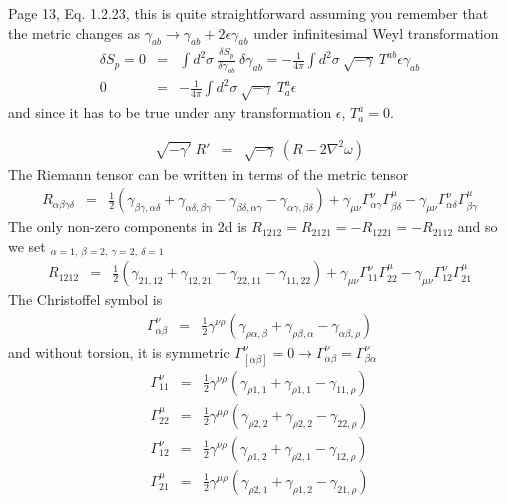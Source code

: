 \documentclass[aps,preprint,preprintnumbers,nofootinbib,showpacs,prd]{revtex4-1}
\newcommand{\nbea}{\begin{eqnarray*}}
\newcommand{\neea}{\end{eqnarray*}}
\begin{document}
Page 13, Eq. 1.2.23, this is quite straightforward assuming you remember that the metric changes as $\gamma_{ab} \rightarrow \gamma_{ab} + 2\epsilon\gamma_{ab}$ under infinitesimal Weyl transformation
%
\nbea
\delta S_p = 0 & = & \int d^2\sigma~\frac{\delta S_p}{\delta \gamma_{ab}} ~\delta \gamma_{ab} = -\frac{1}{4\pi} \int d^2\sigma~\sqrt{-\gamma} ~T^{ab} \epsilon \gamma_{ab} \\
0 & = & -\frac{1}{4\pi} \int d^2\sigma~\sqrt{-\gamma} ~T^{a}_a \epsilon
\neea
%
and since it has to be true under any transformation $\epsilon$, $T^a_a = 0$.





%
\nbea
\sqrt{-\gamma'}~R' & = & \sqrt{-\gamma}~(R - 2\nabla^2\omega)
\neea
%
The Riemann tensor can be written in terms of the metric tensor
%
\nbea
R_{\alpha\beta\gamma\delta} & = & \frac{1}{2} \left ( \gamma_{\beta\gamma,\alpha\delta} + \gamma_{\alpha\delta,\beta\gamma} - \gamma_{\beta\delta,\alpha\gamma} - \gamma_{\alpha\gamma,\beta\delta} \right ) + \gamma_{\mu\nu}\Gamma^{\nu}_{\alpha\gamma}\Gamma^{\mu}_{\beta\delta} - \gamma_{\mu\nu}\Gamma^{\nu}_{\alpha\delta}\Gamma^{\mu}_{\beta\gamma}
\neea
%
The only non-zero components in 2d is $R_{1212}=R_{2121}=-R_{1221}=-R_{2112}$ and so we set $_{\alpha = 1,~ \beta = 2, ~\gamma=2, ~\delta = 1}$
%
\nbea
R_{1212} & = & \frac{1}{2} \left ( \gamma_{21,12} + \gamma_{12,21} - \gamma_{22,11} - \gamma_{11,22} \right ) + \gamma_{\mu\nu}\Gamma^{\nu}_{11}\Gamma^{\mu}_{22} - \gamma_{\mu\nu}\Gamma^{\nu}_{12}\Gamma^{\mu}_{21}
\neea
%
The Christoffel symbol is
%
\nbea
\Gamma^\nu_{\alpha\beta} & = & \frac{1}{2} \gamma^{\nu\rho} \left ( \gamma_{\rho\alpha,\beta} + \gamma_{\rho\beta,\alpha} - \gamma_{\alpha\beta,\rho} \right )
\neea
%
and without torsion, it is symmetric $\Gamma^\nu_{[\alpha\beta]} = 0 \rightarrow \Gamma^\nu_{\alpha\beta} = \Gamma^\nu_{\beta\alpha}$
%
\nbea
\Gamma^\nu_{11} & = & \frac{1}{2} \gamma^{\nu\rho} \left ( \gamma_{\rho1,1} + \gamma_{\rho1,1} - \gamma_{11,\rho} \right ) \\
\Gamma^\mu_{22} & = & \frac{1}{2} \gamma^{\mu\rho} \left ( \gamma_{\rho2,2} + \gamma_{\rho2,2} - \gamma_{22,\rho} \right )\\
\Gamma^\nu_{12} & = & \frac{1}{2} \gamma^{\nu\rho} \left ( \gamma_{\rho1,2} + \gamma_{\rho2,1} - \gamma_{12,\rho} \right ) \\
\Gamma^\mu_{21} & = & \frac{1}{2} \gamma^{\mu\rho} \left ( \gamma_{\rho2,1} + \gamma_{\rho1,2} - \gamma_{21,\rho} \right ) \\
\neea
%
\end{document}
